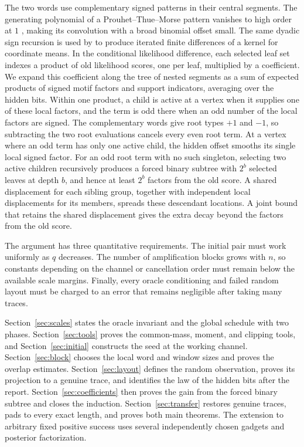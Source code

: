 The two words use complementary signed patterns in their central segments.  The generating polynomial of a Prouhet--Thue--Morse pattern vanishes to high order at $1$ \citep[Proposition 2 and Theorem 6]{AlloucheShallit1999}, making its convolution with a broad binomial offset small.  The same dyadic sign recursion is used by \citet[Section 3.2, equation (3.10)]{HMPW2008} to produce iterated finite differences of a kernel for coordinate means.  In the conditional likelihood difference, each selected leaf set indexes a product of old likelihood scores, one per leaf, multiplied by a coefficient.  We expand this coefficient along the tree of nested segments as a sum of expected products of signed motif factors and support indicators, averaging over the hidden bits.  Within one product, a child is active at a vertex when it supplies one of these local factors, and the term is odd there when an odd number of the local factors are signed.  The complementary words give root types $+1$ and $-1$, so subtracting the two root evaluations cancels every even root term.  At a vertex where an odd term has only one active child, the hidden offset smooths its single local signed factor.  For an odd root term with no such singleton, selecting two active children recursively produces a forced binary subtree with $2^b$ selected leaves at depth $b$, and hence at least $2^b$ factors from the old score.  A shared displacement for each sibling group, together with independent local displacements for its members, spreads these descendant locations.  A joint bound that retains the shared displacement gives the extra decay beyond the factors from the old score.

The argument has three quantitative requirements.  The initial pair must work uniformly as $q$ decreases.  The number of amplification blocks grows with $n$, so constants depending on the channel or cancellation order must remain below the available scale margins.  Finally, every oracle conditioning and failed random layout must be charged to an error that remains negligible after taking many traces.

Section~\ref{sec:scales} states the oracle invariant and the global schedule with two phases.  Section~\ref{sec:tools} proves the common-mass, moment, and clipping tools, and Section~\ref{sec:initial} constructs the seed at the working channel.  Section~\ref{sec:block} chooses the local word and window sizes and proves the overlap estimates.  Section~\ref{sec:layout} defines the random observation, proves its projection to a genuine trace, and identifies the law of the hidden bits after the report.  Section~\ref{sec:coefficients} then proves the gain from the forced binary subtree and closes the induction.  Section~\ref{sec:transfer} restores genuine traces, pads to every exact length, and proves both main theorems.  The extension to arbitrary fixed positive success uses several independently chosen gadgets and posterior factorization.

